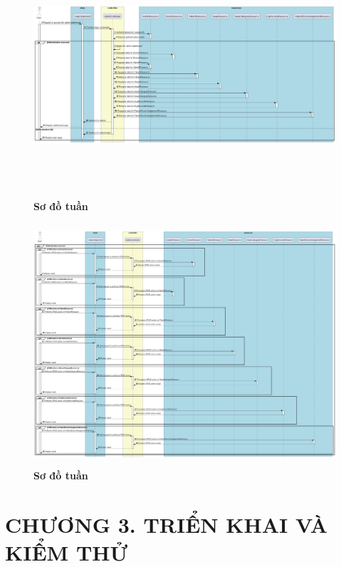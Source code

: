 \documentclass{article}%
\begin{document}
\begin{figure}[H]
  \centering
  \includegraphics[width=16cm,height=9cm]{Images/server/sequence/web/seq_auth.png}
  \caption[Sơ đồ tuần tự ]{\bfseries \fontsize{12pt}{0pt}
  \selectfont Sơ đồ tuần }
  \label{hinh21} %
\end{figure}

\begin{figure}[H]
  \centering
  \includegraphics[width=16cm,height=9cm]{Images/server/sequence/web/seq_crud.png}
  \caption[Sơ đồ tuần tự ]{\bfseries \fontsize{12pt}{0pt}
  \selectfont Sơ đồ tuần }
  \label{hinh21} %
\end{figure}


\newpage
\section*{CHƯƠNG 3. TRIỂN KHAI VÀ KIỂM THỬ}
\setcounter{section}{3}
\setcounter{subsection}{0} %
\setcounter{table}{0} %
\setcounter{figure}{0} %
\end{document}
